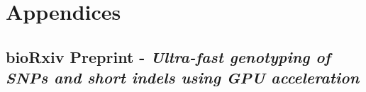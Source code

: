 \section{Appendices} \label{appendices}

\subsection{bioRxiv Preprint - \textit{Ultra-fast genotyping of SNPs and short indels using GPU acceleration}}

